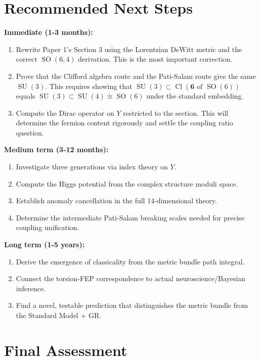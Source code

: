 \documentclass[12pt,a4paper]{article}
\DeclareMathOperator{\SO}{SO}
\DeclareMathOperator{\SU}{SU}
\DeclareMathOperator{\Cl}{Cl}
\begin{document}
\section{Recommended Next Steps}

\textbf{Immediate (1-3 months):}
\begin{enumerate}
\item Rewrite Paper 1's Section 3 using the Lorentzian DeWitt metric and the correct $\SO(6,4)$ derivation. This is the most important correction.
\item Prove that the Clifford algebra route and the Pati-Salam route give the same $\SU(3)$. This requires showing that $\SU(3) \subset \Cl(\mathbf{6} \text{ of } \SO(6))$ equals $\SU(3) \subset \SU(4) \cong \SO(6)$ under the standard embedding.
\item Compute the Dirac operator on $Y$ restricted to the section. This will determine the fermion content rigorously and settle the coupling ratio question.
\end{enumerate}

\textbf{Medium term (3-12 months):}
\begin{enumerate}
\item Investigate three generations via index theory on $Y$.
\item Compute the Higgs potential from the complex structure moduli space.
\item Establish anomaly cancellation in the full 14-dimensional theory.
\item Determine the intermediate Pati-Salam breaking scales needed for precise coupling unification.
\end{enumerate}

\textbf{Long term (1-5 years):}
\begin{enumerate}
\item Derive the emergence of classicality from the metric bundle path integral.
\item Connect the torsion-FEP correspondence to actual neuroscience/Bayesian inference.
\item Find a novel, testable prediction that distinguishes the metric bundle from the Standard Model + GR.
\end{enumerate}

\section{Final Assessment}
\end{document}
